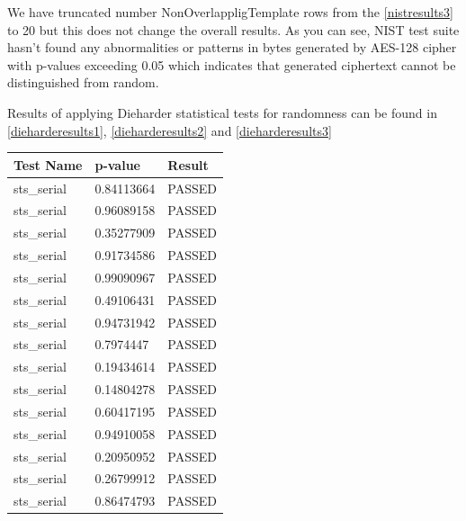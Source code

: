 \documentclass[conference]{IEEEtran}
\begin{document}
We have truncated number NonOverlappligTemplate rows from the \autoref{nistresults3} to 20 but this does not change the overall results. As you can see, NIST test suite hasn't found any abnormalities or patterns in bytes generated by AES-128 cipher with p-values exceeding 0.05 which indicates that  generated ciphertext cannot be distinguished from random. 

Results of applying Dieharder statistical tests for randomness can be found in \autoref{dieharderesults1}, \autoref{dieharderesults2} and \autoref{dieharderesults3}

\begin{center}
\begin{table}[H]
\renewcommand{\arraystretch}{1.2}
\centering
\begin{tabular}{|l|l|l|}
\hline
Test Name                              & p-value    & Result \\ \hline
sts\_serial                            & 0.84113664 & PASSED \\ \hline
sts\_serial                            & 0.96089158 & PASSED \\ \hline
sts\_serial                            & 0.35277909 & PASSED \\ \hline
sts\_serial                            & 0.91734586 & PASSED \\ \hline
sts\_serial                            & 0.99090967 & PASSED \\ \hline
sts\_serial                            & 0.49106431 & PASSED \\ \hline
sts\_serial                            & 0.94731942 & PASSED \\ \hline
sts\_serial                            & 0.7974447  & PASSED \\ \hline
sts\_serial                            & 0.19434614 & PASSED \\ \hline
sts\_serial                            & 0.14804278 & PASSED \\ \hline
sts\_serial                            & 0.60417195 & PASSED \\ \hline
sts\_serial                            & 0.94910058 & PASSED \\ \hline
sts\_serial                            & 0.20950952 & PASSED \\ \hline
sts\_serial                            & 0.26799912 & PASSED \\ \hline
sts\_serial                            & 0.86474793 & PASSED \\ \hline

\end{tabular}
\end{table}
\end{center}
\end{document}
